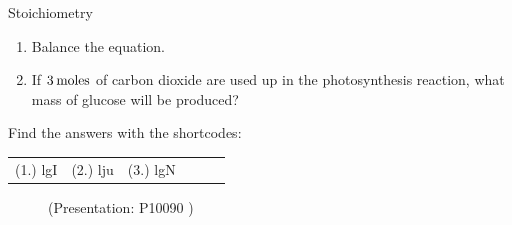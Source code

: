 \begin{exercises}{  Stoichiometry
      }
\begin{enumerate}[noitemsep, label=\textbf{\arabic*}. ]
\begin{enumerate}[noitemsep, label=\textbf{\alph*}. ]
\label{m38712*uid105}\item Balance the equation.
\label{m38712*uid106}\item If $3\phantom{\rule{2pt}{0ex}}\text{moles}$ of carbon dioxide are used up in the photosynthesis reaction, what mass of glucose will be produced?
\end{enumerate}
                \end{enumerate}
 \label{m38712*cid10}
\par {} Find the answers with the shortcodes:
 \par \begin{tabular}[h]{cccccc}
 (1.) lgI  &  (2.) lju  &  (3.) lgN  & \end{tabular}
\end{exercises}

    \label{m38712*eip-269} 
    \setcounter{subfigure}{0}
	\begin{figure}[H] %
    \label{m38712*slidesharemedia}\label{m38712*slideshareflash}
             { (Presentation:  P10090 )}
 \end{figure}       \par

